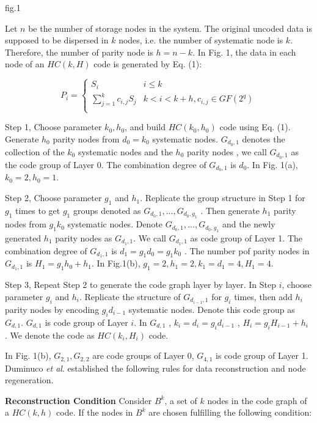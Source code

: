 \documentclass{article} %
\begin{document}
fig.1

Let $n$ be the number of storage nodes in the system. The original uncoded data is supposed to be dispersed in $k$ nodes, i.e. the number of systematic node is $k$. Therefore, the number of parity node is $h = n - k$. In Fig. 1, the data in each node of an $HC(k, H)$ code is generated by Eq. (1):

\begin{equation}
P_i = \left\{
\begin{array}{cc}
S_i & i \le k \\
\sum_{j=1}^kc_{i, j}S_j & k < i < k + h, c_{i, j} \in GF(2^q)\\
\end{array}
\right.
\end{equation}

Step 1, Choose parameter  $k_0, h_0$,  and build $HC(k_0 , h_0)$ code using Eq. (1). Generate $h_0$  parity nodes from $d_0 = k_0$  systematic nodes. $G_{d_0, 1}$  denotes the collection of the $k_0$ systematic nodes and the $h_0$ parity nodes , we call $G_{d_0, 1}$  as the code group of Layer 0. The combination degree of $G_{d_0, 1}$  is $d_0$. In Fig. 1(a), $k_0 = 2, h_0 = 1$.

Step 2, Choose parameter $g_1$ and $h_1$. Replicate the group structure in Step 1 for $g_1$  times to get  $g_1$ groups denoted as $G_{d_0, 1}, ..., G_{d_0, g_1}$ . Then generate $h_1$ parity nodes from $g_1k_0$  systematic nodes. Denote $G_{d_0, 1}, ..., G_{d_0, g_1}$ and the newly generated $h_1$  parity nodes as $G_{d_1, 1}$. We call $G_{d_1, 1}$  as code group of Layer 1. The combination degree of $G_{d_1, 1}$  is $d_1 = g_1d_0 = g_1k_0$ . The number pof parity nodes in $G_{d_1, 1}$ is $H_1 = g_1h_0 + h_1$. In Fig.1(b), $g_1 = 2, h_1 = 2, k_1 = d_1 = 4, H_1 = 4$.

	Step 3, Repeat Step 2 to generate the code graph layer by layer. In Step $i$, choose parameter $g_i$ and $h_i$. Replicate the structure of $G_{d_{i-1}, 1}$  for $g_i$  times, then add $h_i$  parity nodes by encoding $g_id_{i-1}$  systematic nodes. Denote this code group as $G_{d, 1}$. $G_{d, 1}$ is code group of Layer $i$. In $G_{d, 1}$ , $k_i = d_i = g_id_{i- 1}$  , $H_i = g_iH_{i - 1} + h_i$ . We denote the code as $HC(k_i, H_i)$ code.

In Fig. 1(b), $G_{2, 1}, G_{2, 2}$  are code groups of Layer 0, $G_{4, 1}$ is code group of Layer 1. Duminuco \emph{et al}. established the following rules for data reconstruction and node regeneration.

\textbf{Reconstruction Condition} Consider $B^k$, a set of $k$ nodes in the code graph of a $HC(k, h)$ code. If the nodes in $B^k$ are chosen fulfilling the following condition:
\end{document}
